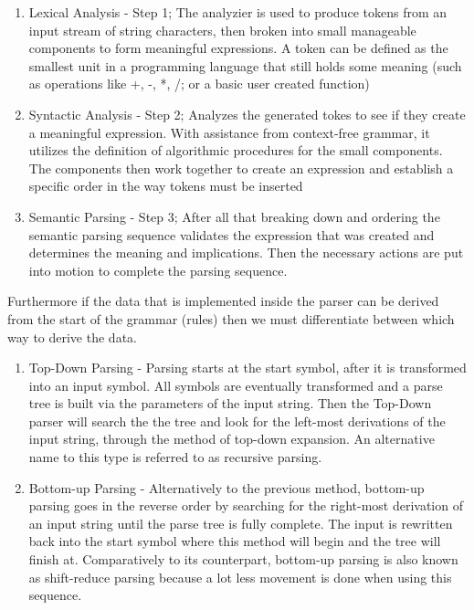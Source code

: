 \documentclass{article}
\begin{document}
    \begin{enumerate}
        \item Lexical Analysis - Step 1; The analyzier is used to produce tokens from an input stream of string characters, then broken into small manageable components to form meaningful expressions. A token can be defined as the smallest unit in a programming language that still holds some meaning (such as operations like +, -, *, /; or a basic user created function)
        \item Syntactic Analysis - Step 2; Analyzes the generated tokes to see if they create a meaningful expression. With assistance from context-free grammar, it utilizes the definition of algorithmic procedures for the small components. The components then work together to create an expression and establish a specific order in the way tokens must be inserted
        \item Semantic Parsing - Step 3; After all that breaking down and ordering the semantic parsing sequence validates the expression that was created and determines the meaning and implications. Then the necessary actions are put into motion to complete the parsing sequence.
    \end{enumerate}
    
    \noindent Furthermore if the data that is implemented inside the parser can be derived from the start of the grammar (rules) then we must differentiate between which way to derive the data.
    
    \begin{enumerate}
        \item Top-Down Parsing - Parsing starts at the start symbol, after it is transformed into an input symbol. All symbols are eventually transformed and a parse tree is built via the parameters of the input string. Then the Top-Down parser will search the the tree and look for the left-most derivations of the input string, through the method of top-down expansion. An alternative name to this type is referred to as recursive parsing.
        \item Bottom-up Parsing - Alternatively to the previous method, bottom-up parsing goes in the reverse order by searching for the right-most derivation of an input string until the parse tree is fully complete. The input is rewritten back into the start symbol where this method will begin and the tree will finish at. Comparatively to its counterpart, bottom-up parsing is also known as shift-reduce parsing because a lot less movement is done when using this sequence.
        
    \end{enumerate}
    
\end{document}
